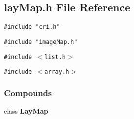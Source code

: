 \subsection{lay\-Map.h File Reference}
\label{layMap.h}
{\tt \#include "cri.h"}\par
{\tt \#include "image\-Map.h"}\par
{\tt \#include $<$list.h$>$}\par
{\tt \#include $<$array.h$>$}\par
\subsubsection*{Compounds}
\begin{CompactItemize}
\item 
class {\bf Lay\-Map}
\end{CompactItemize}
